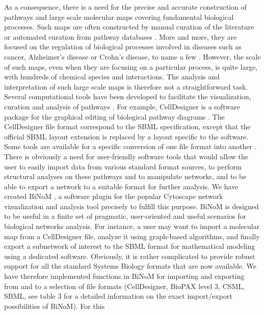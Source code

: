 \documentclass[10pt]{bmc_article}
\newenvironment{bmcformat}{\baselineskip20pt\sloppy\setboolean{publ}{false}}{\baselineskip20pt\sloppy}
\begin{document}
\begin{bmcformat}
As a consequence, there is a need for the precise and accurate construction of
pathways and large scale molecular maps covering fundamental biological
processes. Such maps are often constructed by manual curation of the literature or
automated curation from pathway databases \cite{bauer2009pathway}. More and more, they
are focused on the regulation of biological processes involved in diseases such
as cancer, Alzheimer's disease or Crohn's disease, to name a few \cite{oda2005comprehensive, oda2006comprehensive,
calzone2008comprehensive, caron2010comprehensive}. However, the scale of such
maps, even when they are focusing on a particular process, is quite large, with
hundreds of chemical species and interactions. The analysis and interpretation of such
large scale maps is therefore not a straightforward task. Several computational
tools have been developed to facilitate the visualization, curation and analysis
of pathways \cite{adriaens2008public}. For example, CellDesigner is a software package
for the graphical editing of biological pathway diagrams
\cite{funahashi2003celldesigner}. The CellDesigner file format correspond to the
SBML specification, except that the official SBML layout extension is replaced
by a layout specific to the software. Some tools are
available for a specific conversion of one file format into another
\cite{mi2011biopax, buchel2012qualitative}. There is obviously
a need for user-friendly software tools that would allow the user to easily
import data from various standard format sources, to perform structural analyses on these pathways
and to manipulate networks, and to be able to export a network to a suitable
format for further analysis. We have created
BiNoM \cite{zinovyev2008binom}, a software plugin for the popular Cytoscape
network vizualization and analysis tool \cite{cline2007integration} precisely to fulfill this purpose.
BiNoM is designed to be useful in a finite set of pragmatic, user-oriented and
useful scenarios for biological networks analysis. For instance, a user may want
to import a molecular map from a CellDesigner file, analyze it using graph-based
algorithms, and finally export a subnetwork of interest to the SBML format for
mathematical modeling using a dedicated software. Obviously, it is rather
complicated to provide robust support for all the standard Systems Biology
formats that are now available. We have therefore implemented functions in BiNoM
for importing and exporting from and to a selection of file formats
(CellDesigner, BioPAX level 3, CSML, SBML, see table 3 for a detailed
information on the exact import/export possibilities of BiNoM). For this

\end{bmcformat}
\end{document}
